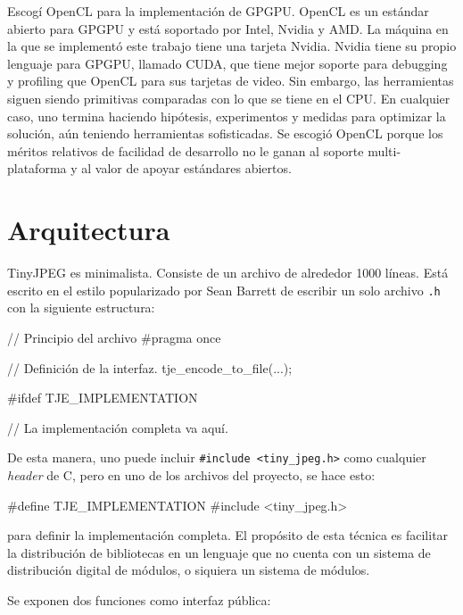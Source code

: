 Escogí OpenCL para la implementación de GPGPU. OpenCL es un estándar abierto
para GPGPU y está soportado por Intel, Nvidia y AMD. La máquina en la que se
implementó este trabajo tiene una tarjeta Nvidia. Nvidia tiene su propio
lenguaje para GPGPU, llamado CUDA, que tiene mejor soporte para debugging y
profiling que OpenCL para sus tarjetas de video. Sin embargo, las herramientas
siguen siendo primitivas comparadas con lo que se tiene en el CPU. En cualquier
caso, uno termina haciendo hipótesis, experimentos y medidas para optimizar la
solución, aún teniendo herramientas sofisticadas. Se escogió OpenCL porque los
méritos relativos de facilidad de desarrollo no le ganan al soporte
multi-plataforma y al valor de apoyar estándares abiertos.

\section{Arquitectura}

TinyJPEG es minimalista. Consiste de un archivo de alrededor 1000 líneas. Está
escrito en el estilo popularizado por Sean Barrett de escribir un solo archivo
\verb+.h+ con la siguiente estructura:

\label{alg:stb}
\begin{code}[language=C][h]
    // Principio del archivo
    #pragma once

    // Definición de la interfaz.
    tje_encode_to_file(...);

    #ifdef TJE_IMPLEMENTATION

    // La implementación completa va aquí.
\end{code}

De esta manera, uno puede incluir \verb+#include <tiny_jpeg.h>+ como cualquier
\emph{header} de C, pero en uno de los archivos del proyecto, se hace esto:

\label{alg:stb_impl}
\begin{code}[language=C][h]
    #define TJE_IMPLEMENTATION
    #include <tiny_jpeg.h>
\end{code}

para definir la implementación completa. El propósito de esta técnica es
facilitar la distribución de bibliotecas en un lenguaje que no cuenta con un
sistema de distribución digital de módulos,
o siquiera un sistema de módulos.

Se exponen dos funciones como interfaz pública:


